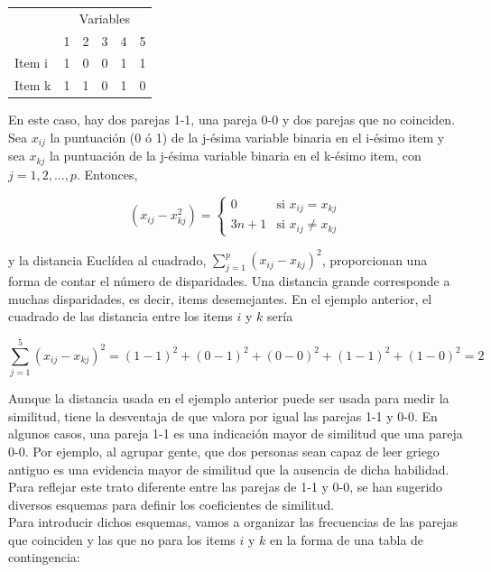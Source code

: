 \documentclass[a4paper, 20pt]{article}
\begin{document}
\begin{table}[]
\begin{tabular}{llllll}
       & \multicolumn{5}{c}{Variables} \\
       & 1    & 2    & 3   & 4   & 5   \\
Item i & 1    & 0    & 0   & 1   & 1   \\
Item k & 1    & 1    & 0   & 1   & 0  
\end{tabular}
\end{table}

En este caso, hay dos parejas 1-1, una pareja 0-0 y dos parejas que no coinciden.\\

Sea $x_{ij}$ la puntuación (0 ó 1) de la j-ésima variable binaria en el i-ésimo item y sea $x_{kj}$ la puntuación de la j-ésima variable binaria en el k-ésimo item, con $j=1,2,...,p$. Entonces,

$$(x_{ij}-x_{kj}^2) = \left \{ \begin{matrix} 0 & \mbox{si } x_{ij}=x_{kj}
\\ 3n+1 & \mbox{si }x_{ij}\neq x_{kj}\end{matrix}\right.   $$

y la distancia Euclídea al cuadrado, $\sum_{j=1}^p{(x_{ij}-x_{kj})^2}$, proporcionan una forma de contar el número de disparidades. Una distancia grande corresponde a muchas disparidades, es decir, items desemejantes. En el ejemplo anterior, el cuadrado de las distancia entre los items $i$ y $k$ sería

$$\sum_{j=1}^5{(x_{ij}-x_{kj})^2}=(1-1)^2+(0-1)^2+(0-0)^2+(1-1)^2+(1-0)^2=2$$

Aunque la distancia usada en el ejemplo anterior puede ser usada para medir la similitud, tiene la desventaja de que valora por igual las parejas 1-1 y 0-0. En algunos casos, una pareja 1-1 es una indicación mayor de similitud que una pareja 0-0. Por ejemplo, al agrupar gente, que dos personas sean capaz de leer griego antiguo es una evidencia mayor de similitud que la ausencia de dicha habilidad. Para reflejar este trato diferente entre las parejas de 1-1 y 0-0, se han sugerido diversos esquemas para definir los coeficientes de similitud.\\
Para introducir dichos esquemas, vamos a organizar las frecuencias de las parejas que coinciden y las que no para los items $i$ y $k$ en la forma de una tabla de contingencia:

\end{document}
